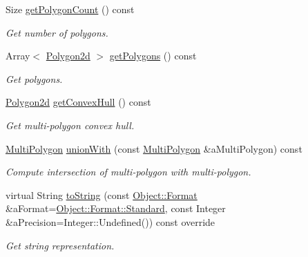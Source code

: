 \begin{DoxyCompactItemize}
Size \hyperlink{classostk_1_1math_1_1geom_1_1d2_1_1objects_1_1_multi_polygon_a52386a4ee9cf5fa92cb42e9d4ba3fd93}{get\+Polygon\+Count} () const
\begin{DoxyCompactList}\small\item\em Get number of polygons. \end{DoxyCompactList}\item 
Array$<$ \hyperlink{namespaceostk_1_1math_1_1geom_1_1d2_1_1objects_a5786a3021d23f9c64937e263a2da9d27}{Polygon2d} $>$ \hyperlink{classostk_1_1math_1_1geom_1_1d2_1_1objects_1_1_multi_polygon_a54cfcbcd53d46d76420ad3ff122f3ef1}{get\+Polygons} () const
\begin{DoxyCompactList}\small\item\em Get polygons. \end{DoxyCompactList}\item 
\hyperlink{namespaceostk_1_1math_1_1geom_1_1d2_1_1objects_a5786a3021d23f9c64937e263a2da9d27}{Polygon2d} \hyperlink{classostk_1_1math_1_1geom_1_1d2_1_1objects_1_1_multi_polygon_af73cf685c2fec86bbbe0aa2ee20a5e64}{get\+Convex\+Hull} () const
\begin{DoxyCompactList}\small\item\em Get multi-\/polygon convex hull. \end{DoxyCompactList}\item 
\hyperlink{classostk_1_1math_1_1geom_1_1d2_1_1objects_1_1_multi_polygon}{Multi\+Polygon} \hyperlink{classostk_1_1math_1_1geom_1_1d2_1_1objects_1_1_multi_polygon_a0762c6a4b4aaa70082394df690f3c96c}{union\+With} (const \hyperlink{classostk_1_1math_1_1geom_1_1d2_1_1objects_1_1_multi_polygon}{Multi\+Polygon} \&a\+Multi\+Polygon) const
\begin{DoxyCompactList}\small\item\em Compute intersection of multi-\/polygon with multi-\/polygon. \end{DoxyCompactList}\item 
virtual String \hyperlink{classostk_1_1math_1_1geom_1_1d2_1_1objects_1_1_multi_polygon_abf52343dc62ec2d62d971bef636f6c1c}{to\+String} (const \hyperlink{classostk_1_1math_1_1geom_1_1d2_1_1_object_aa76f9e30caebf4005bafbdff447f66cf}{Object\+::\+Format} \&a\+Format=\hyperlink{classostk_1_1math_1_1geom_1_1d2_1_1_object_aa76f9e30caebf4005bafbdff447f66cfaeb6d8ae6f20283755b339c0dc273988b}{Object\+::\+Format\+::\+Standard}, const Integer \&a\+Precision=Integer\+::\+Undefined()) const override
\begin{DoxyCompactList}\small\item\em Get string representation. \end{DoxyCompactList}\item 

\end{DoxyCompactItemize}
